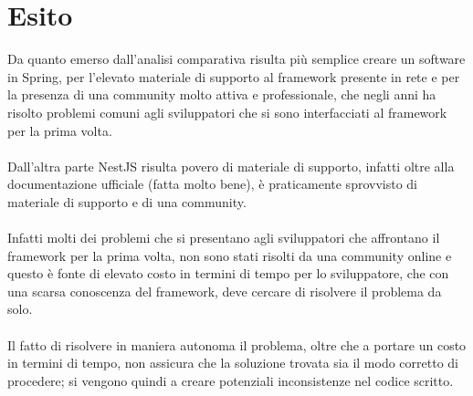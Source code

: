 \section{Esito}
Da quanto emerso dall'analisi comparativa risulta più semplice creare un software in Spring, per l'elevato materiale di
supporto al framework presente in rete e per la presenza di una community molto attiva e professionale, che negli
anni ha risolto problemi comuni agli sviluppatori che si sono interfacciati al framework per la prima volta. 
\\\\
Dall'altra parte NestJS risulta povero di materiale di supporto, infatti oltre alla documentazione ufficiale (fatta molto
bene), è praticamente sprovvisto di materiale di supporto e di una community.
\\\\
Infatti molti dei problemi che si presentano agli sviluppatori che affrontano il framework per la prima volta, non sono
stati risolti da una community online e questo è fonte di elevato costo in termini di tempo per lo sviluppatore, che con 
una scarsa conoscenza del framework, deve cercare di risolvere il problema da solo.
\\\\
Il fatto di risolvere in maniera autonoma il problema, oltre che a portare un costo in termini di tempo, non assicura 
che la soluzione trovata sia il modo corretto di procedere; si vengono quindi a creare potenziali inconsistenze nel codice
scritto.